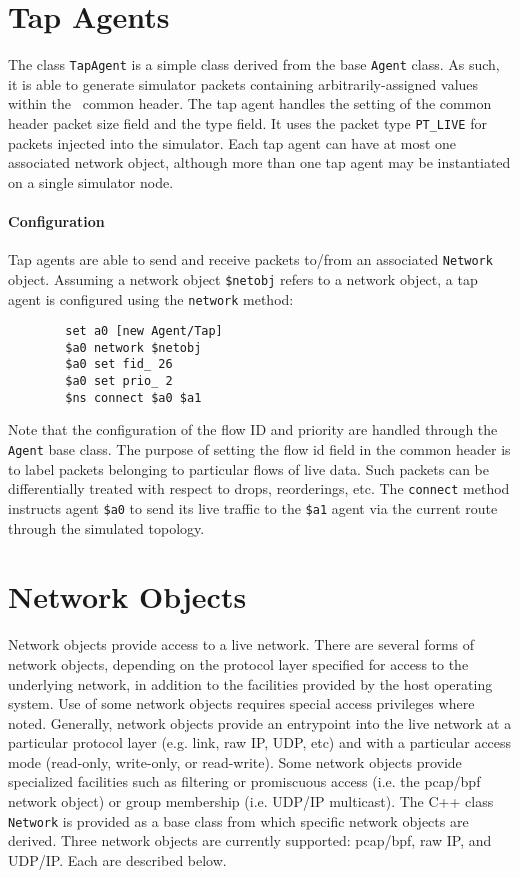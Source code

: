 \section{Tap Agents}

The class {\tt TapAgent} is a simple class derived from the base
{\tt Agent} class.
As such, it is able to generate simulator packets containing
arbitrarily-assigned values within the \ns~common header.
The tap agent handles the setting of the common header packet
size field and the type field.  
It uses the packet type {\tt PT\_LIVE} for packets injected
into the simulator.
Each tap agent can have at most one associated network object, although
more than one tap agent may be instantiated on a single simulator node.

\paragraph{Configuration}
Tap agents are able to send and receive packets to/from an
associated {\tt Network} object.
Assuming a network object {\tt \$netobj} refers to a network
object, a tap agent is configured using the {\tt network} method:
\begin{verbatim}
        set a0 [new Agent/Tap]
        $a0 network $netobj
        $a0 set fid_ 26
        $a0 set prio_ 2
        $ns connect $a0 $a1
\end{verbatim}
Note that the configuration of the flow ID and priority are
handled through the {\tt Agent} base class.
The purpose of setting the flow id field in the common header
is to label packets belonging to particular flows of live data.
Such packets can be differentially treated with respect
to drops, reorderings, etc.
The {\tt connect} method instructs agent {\tt \$a0} to send
its live traffic to the {\tt \$a1} agent via the current
route through the simulated topology.

\section{Network Objects}

Network objects provide access to a live network.
There are several forms of network objects, depending on the
protocol layer specified for access to the underlying network,
in addition to the facilities provided by the host operating system.
Use of some network objects requires special access
privileges where noted.
Generally, network objects provide an entrypoint into the live
network at a particular protocol layer (e.g. link, raw IP, UDP, etc)
and with a particular access mode (read-only, write-only, or read-write).
Some network objects provide specialized facilities such as filtering
or promiscuous access (i.e. the pcap/bpf network object)
or group membership (i.e. UDP/IP multicast).
The C++ class {\tt Network} is provided as a base class from
which specific network objects are derived.
Three network objects are currently supported: pcap/bpf, raw IP,
and UDP/IP.
Each are described below.

